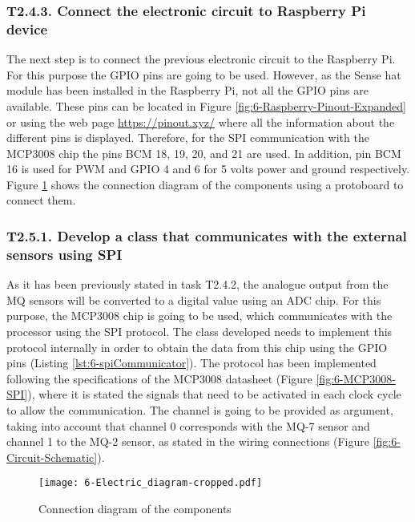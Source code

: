 \subsubsection{T2.4.3. Connect the electronic circuit to Raspberry Pi device}
The next step is to connect the previous electronic circuit to the Raspberry Pi. For this purpose the GPIO pins are going to be used. However, as the Sense hat module has been installed in the Raspberry Pi, not all the GPIO pins are available. These pins can be located in Figure \ref{fig:6-Raspberry-Pinout-Expanded} or using the web page \url{https://pinout.xyz/} where all the information about the different pins is displayed. Therefore, for the \ac{SPI} communication with the MCP3008 chip the pins BCM  18, 19, 20, and 21 are used. In addition, pin BCM 16 is used for \ac{PWM} and GPIO 4 and 6 for 5 volts power and ground respectively. Figure \ref{fig:6-Electric_diagram.pdf} shows the connection diagram of the components using a protoboard to connect them.


\subsubsection{T2.5.1. Develop a class that communicates with the external sensors using \ac{SPI}}
As it has been previously stated in task T2.4.2, the analogue output from the MQ sensors will be converted to a digital value using an \ac{ADC} chip. For this purpose, the MCP3008 chip \cite{ADC} is going to be used, which communicates with the processor using the \ac{SPI} protocol. The class developed needs to implement this protocol internally in order to obtain the data from this chip using the GPIO pins (Listing \ref{lst:6-spiCommunicator}). The protocol has been implemented following the specifications of the MCP3008 datasheet (Figure \ref{fig:6-MCP3008-SPI}), where it is stated the signals that need to be activated in each clock cycle to allow the communication. The channel is going to be provided as argument, taking into account that channel 0 corresponds with the MQ-7 sensor and channel 1 to the MQ-2 sensor, as stated in the wiring connections (Figure \ref{fig:6-Circuit-Schematic}).

\begin{figure}[!h]
	\begin{center}
		\texttt{[image: 6-Electric\_diagram-cropped.pdf]}
		\caption{Connection diagram of the components}
		\label{fig:6-Electric_diagram.pdf}
	\end{center}
\end{figure}

